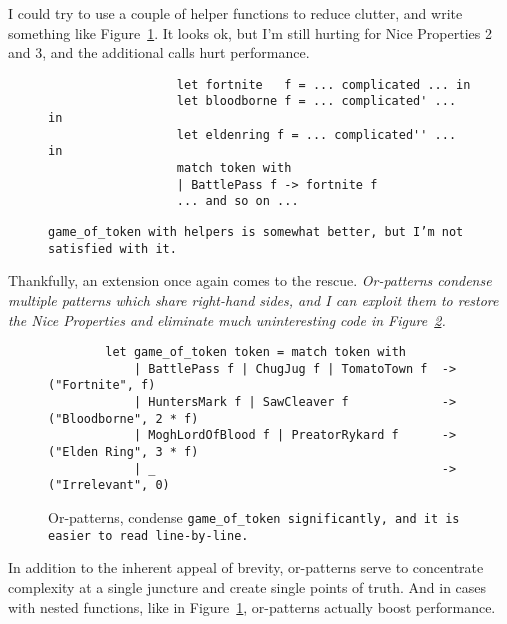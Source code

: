 \documentclass[manuscript,screen,review, 12pt, nonacm]{acmart}
\begin{document}
\begin{outline}[enumerate]
        I could try to use a couple of helper functions to reduce clutter, and
        write something like Figure~\ref{fig:helpergot}. It looks ok, but I'm
        still hurting for Nice Properties 2 and 3, and the additional calls
        hurt performance. 

        \begin{figure}
            \begin{center}
                \begin{verbatim}
                  let fortnite   f = ... complicated ... in
                  let bloodborne f = ... complicated' ... in
                  let eldenring f = ... complicated'' ... in
                  match token with
                  | BattlePass f -> fortnite f
                  ... and so on ...                
                \end{verbatim}
            \end{center}    
        \caption{\tt{game\_of\_token} with helpers is somewhat better, but I'm
        not satisfied with it.} 
        \label{fig:helpergot}
        \end{figure}

        Thankfully, an extension once again comes to the rescue.
        \it{Or-patterns} condense multiple patterns which share right-hand
        sides, and I can exploit them to restore the Nice Properties and
        eliminate much uninteresting code in Figure~\ref{fig:orgot}.

    \begin{figure}
    \begin{center}
    \begin{verbatim}
        let game_of_token token = match token with 
            | BattlePass f | ChugJug f | TomatoTown f  -> ("Fortnite", f)
            | HuntersMark f | SawCleaver f             -> ("Bloodborne", 2 * f)
            | MoghLordOfBlood f | PreatorRykard f      -> ("Elden Ring", 3 * f)
            | _                                        -> ("Irrelevant", 0)
    \end{verbatim}
    \end{center}    
    \caption{Or-patterns, condense \tt{game\_of\_token}
    significantly, and it is easier to read line-by-line.} 
    \label{fig:orgot}
    \end{figure}

    In addition to the inherent appeal of brevity, or-patterns serve to
    concentrate complexity at a single juncture and create single points of
    truth. And in cases with nested functions, like in
    Figure~\ref{fig:helpergot}, or-patterns actually boost performance.
      

\end{outline}
\end{document}
